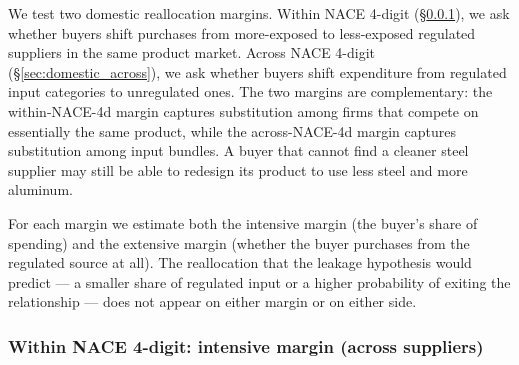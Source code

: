 
We test two domestic reallocation margins. Within NACE 4-digit (\S\ref{sec:domestic_within_intensive}), we ask whether buyers shift purchases from more-exposed to less-exposed regulated suppliers in the same product market. Across NACE 4-digit (\S\ref{sec:domestic_across}), we ask whether buyers shift expenditure from regulated input categories to unregulated ones. The two margins are complementary: the within-NACE-4d margin captures substitution among firms that compete on essentially the same product, while the across-NACE-4d margin captures substitution among input bundles. A buyer that cannot find a cleaner steel supplier may still be able to redesign its product to use less steel and more aluminum.

For each margin we estimate both the intensive margin (the buyer's share of spending) and the extensive margin (whether the buyer purchases from the regulated source at all). The reallocation that the leakage hypothesis would predict --- a smaller share of regulated input or a higher probability of exiting the relationship --- does not appear on either margin or on either side.

\subsubsection{Within NACE 4-digit: intensive margin (across suppliers)}\label{sec:domestic_within_intensive}

